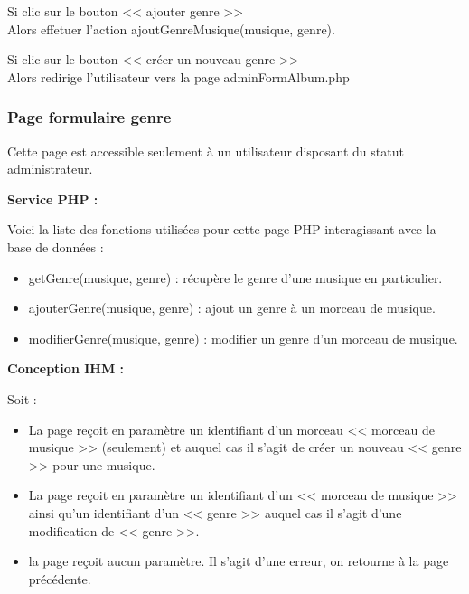 			\begin{paragraphe}
				Si clic sur le bouton << ajouter genre >> \\
				Alors effetuer l'action ajoutGenreMusique(musique, genre).
			\end{paragraphe}

			\begin{paragraphe}
				Si clic sur le bouton << créer un nouveau genre >> \\
				Alors redirige l'utilisateur vers la page adminFormAlbum.php
			\end{paragraphe}

	\clearpage

		\subsubsection{Page formulaire genre}

			\begin{paragraphe}
				Cette page est accessible seulement à un utilisateur disposant du statut administrateur.
			\end{paragraphe}

			\begin{paragraphe}
				\textbf{Service PHP :}
			\end{paragraphe}

			\begin{paragraphe}
				Voici la liste des fonctions utilisées pour cette page PHP interagissant avec la base de données :
				\begin{itemize}
					\item getGenre(musique, genre) : récupère le genre d'une musique en particulier.
					\item ajouterGenre(musique, genre) : ajout un genre à un morceau de musique.
					\item modifierGenre(musique, genre) : modifier un genre d'un morceau de musique.
				\end{itemize}
			\end{paragraphe}

			\begin{paragraphe}
				\textbf{Conception IHM :}
			\end{paragraphe}

			\begin{paragraphe}
				Soit :
				\begin{itemize}
					\item La page reçoit en paramètre un identifiant d'un morceau << morceau de musique >> (seulement) et auquel cas il s'agit de créer un nouveau << genre >> pour une musique.
					\item La page reçoit en paramètre un identifiant d'un << morceau de musique >> ainsi qu'un identifiant d'un << genre >> auquel cas il s'agit d'une modification de << genre >>.
					\item la page reçoit aucun paramètre. Il s'agit d'une erreur, on retourne à la page précédente.
				\end{itemize}
			\end{paragraphe}


